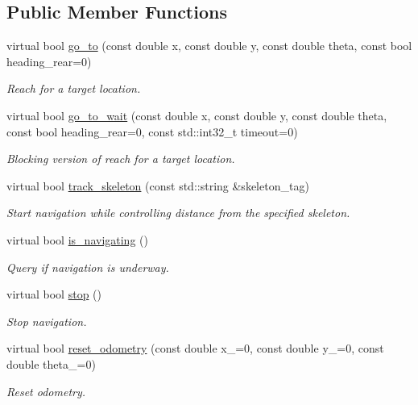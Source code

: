 \subsection*{Public Member Functions}
\begin{DoxyCompactItemize}
\item 
virtual bool \hyperlink{classnavController__IDL_aa2b9b90e9d2ef2fd8d557e8c99a8ca7d}{go\+\_\+to} (const double x, const double y, const double theta, const bool heading\+\_\+rear=0)
\begin{DoxyCompactList}\small\item\em Reach for a target location. \end{DoxyCompactList}\item 
virtual bool \hyperlink{classnavController__IDL_aec1be2f92b59c4669dff3766b519a971}{go\+\_\+to\+\_\+wait} (const double x, const double y, const double theta, const bool heading\+\_\+rear=0, const std\+::int32\+\_\+t timeout=0)
\begin{DoxyCompactList}\small\item\em Blocking version of reach for a target location. \end{DoxyCompactList}\item 
virtual bool \hyperlink{classnavController__IDL_a09b17abbbfc5129f86de9f9bb2c5e230}{track\+\_\+skeleton} (const std\+::string \&skeleton\+\_\+tag)
\begin{DoxyCompactList}\small\item\em Start navigation while controlling distance from the specified skeleton. \end{DoxyCompactList}\item 
virtual bool \hyperlink{classnavController__IDL_a2c935f193a150936dfc2cc7482744dbb}{is\+\_\+navigating} ()
\begin{DoxyCompactList}\small\item\em Query if navigation is underway. \end{DoxyCompactList}\item 
virtual bool \hyperlink{classnavController__IDL_a813f076a8130f03c4930ed7659b37e7e}{stop} ()
\begin{DoxyCompactList}\small\item\em Stop navigation. \end{DoxyCompactList}\item 
virtual bool \hyperlink{classnavController__IDL_a3b1f0d0434d00620c82cc844e88f74d9}{reset\+\_\+odometry} (const double x\+\_=0, const double y\+\_=0, const double theta\+\_=0)
\begin{DoxyCompactList}\small\item\em Reset odometry. \end{DoxyCompactList}\item 

\end{DoxyCompactItemize}
